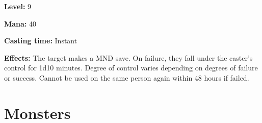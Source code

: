 \documentclass[]{article}
\begin{document}
\textbf{Level:} 9

\textbf{Mana:} 40

\textbf{Casting time:} Instant

\textbf{Effects:} The target makes a MND save. On failure, they fall
under the caster's control for 1d10 minutes. Degree of control varies
depending on degrees of failure or success. Cannot be used on the same
person again within 48 hours if failed.

\section{Monsters}\label{monsters}
\end{document}
